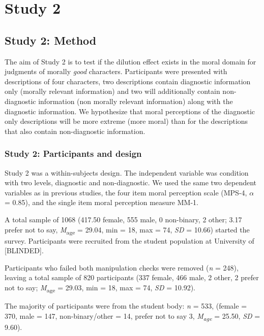 \documentclass[
  american,
  man,floatsintext]{apa7}
\begin{document}
\hypertarget{study-2}{%
\section{Study 2}\label{study-2}}

\hypertarget{study-2-method}{%
\subsection{Study 2: Method}\label{study-2-method}}

The aim of Study 2 is to test if the dilution effect exists in the moral domain for judgments of morally \emph{good} characters. Participants were presented with descriptions of four characters, two descriptions contain diagnostic information only (morally relevant information) and two will additionally contain non-diagnostic information (non morally relevant information) along with the diagnostic information. We hypothesize that moral perceptions of the diagnostic only descriptions will be more extreme (more moral) than for the descriptions that also contain non-diagnostic information.

\hypertarget{study-2-participants-and-design}{%
\subsubsection{Study 2: Participants and design}\label{study-2-participants-and-design}}

Study 2 was a within-subjects design. The independent variable was condition with two levels, diagnostic and non-diagnostic. We used the same two dependent variables as in previous studies, the four item moral perception scale (MPS-4, \(\alpha\) = 0.85), and the single item moral perception measure MM-1.

A total sample of 1068 (417.50 female, 555 male, 0 non-binary, 2 other; 3.17 prefer not to say, \emph{M}\textsubscript{age} = 29.04, min = 18, max = 74, \emph{SD} = 10.66) started the survey. Participants were recruited from the student population at University of {[}BLINDED{]}.

Participants who failed both manipulation checks were removed (\emph{n} = 248), leaving a total sample of 820 participants (337 female, 466 male, 2 other, 2 prefer not to say; \emph{M}\textsubscript{age} = 29.03, min = 18, max = 74, \emph{SD} = 10.92).

The majority of participants were from the student body: \emph{n} = 533, (female = 370, male = 147, non-binary/other = 14, prefer not to say 3, \emph{M\textsubscript{age}} = 25.50, \emph{SD} = 9.60).
\end{document}

